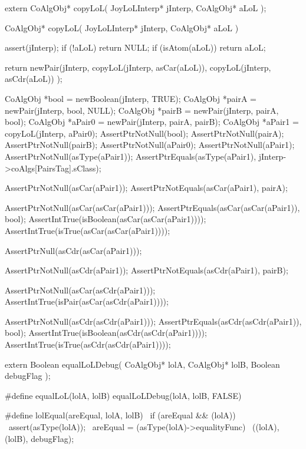 \startTestSuite[copyLoL]

\startCHeader
extern CoAlgObj* copyLoL(
  JoyLoLInterp* jInterp,
  CoAlgObj* aLoL
);
\stopCHeader

\startCCode
CoAlgObj* copyLoL(
  JoyLoLInterp* jInterp,
  CoAlgObj* aLoL
) {
  assert(jInterp);
  if (!aLoL) return NULL;
  if (isAtom(aLoL)) return aLoL;

  return newPair(jInterp,
                 copyLoL(jInterp, asCar(aLoL)),
                 copyLoL(jInterp, asCdr(aLoL))
                 );
}
\stopCCode


\startCTest
  CoAlgObj *bool   = newBoolean(jInterp, TRUE);
  CoAlgObj *pairA  = newPair(jInterp, bool, NULL);
  CoAlgObj *pairB  = newPair(jInterp, pairA, bool);
  CoAlgObj *aPair0 = newPair(jInterp, pairA, pairB);
  CoAlgObj *aPair1 = copyLoL(jInterp, aPair0);
  AssertPtrNotNull(bool);
  AssertPtrNotNull(pairA);
  AssertPtrNotNull(pairB);
  AssertPtrNotNull(aPair0);
  AssertPtrNotNull(aPair1);
  AssertPtrNotNull(asType(aPair1));
  AssertPtrEquals(asType(aPair1), jInterp->coAlgs[PairsTag].sClass);

  AssertPtrNotNull(asCar(aPair1));
  AssertPtrNotEquals(asCar(aPair1), pairA);

  AssertPtrNotNull(asCar(asCar(aPair1)));
  AssertPtrEquals(asCar(asCar(aPair1)), bool);
  AssertIntTrue(isBoolean(asCar(asCar(aPair1))));
  AssertIntTrue(isTrue(asCar(asCar(aPair1))));

  AssertPtrNull(asCdr(asCar(aPair1)));

  AssertPtrNotNull(asCdr(aPair1));
  AssertPtrNotEquals(asCdr(aPair1), pairB);

  AssertPtrNotNull(asCar(asCdr(aPair1)));
  AssertIntTrue(isPair(asCar(asCdr(aPair1))));

  AssertPtrNotNull(asCdr(asCdr(aPair1)));
  AssertPtrEquals(asCdr(asCdr(aPair1)), bool);
  AssertIntTrue(isBoolean(asCdr(asCdr(aPair1))));
  AssertIntTrue(isTrue(asCdr(asCdr(aPair1))));
\stopCTest
\stopTestCase
\stopTestSuite

\startTestSuite[equalLoL]

\startCHeader
extern Boolean equalLoLDebug(
  CoAlgObj* lolA,
  CoAlgObj* lolB,
  Boolean debugFlag
);

#define equalLoL(lolA, lolB) equalLoLDebug(lolA, lolB, FALSE)

#define lolEqual(areEqual, lolA, lolB)	    \
  if (areEqual && (lolA)) {			            \
    assert(asType(lolA));  			            \
    areEqual = (asType(lolA)->equalityFunc)	\
      ((lolA), (lolB), debugFlag);          \
  }
\stopCHeader


